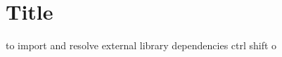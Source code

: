 \documentclass{article}
\begin{document}
\section{Title}


to import and resolve external library dependencies
ctrl shift o 
\end{document}
